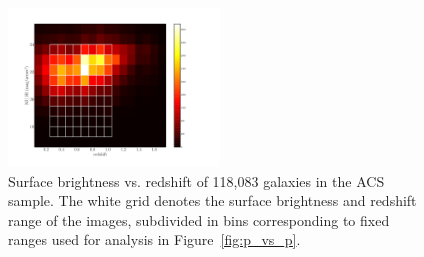 \documentclass[usenatbib]{mn2e}
\begin{document}
\begin{figure}
\begin{center}
\includegraphics[width=0.5\textwidth]{figures/eye_of_sauron.pdf}
\caption{Surface brightness vs. redshift of 118,083 galaxies in the ACS sample. The white grid denotes the surface brightness and redshift range of the \ferengi{} images, subdivided in bins corresponding to fixed ranges used for analysis in Figure~\ref{fig:p_vs_p}.}
\label{fig:sb_redshift}
\end{center}
\end{figure}
\end{document}
